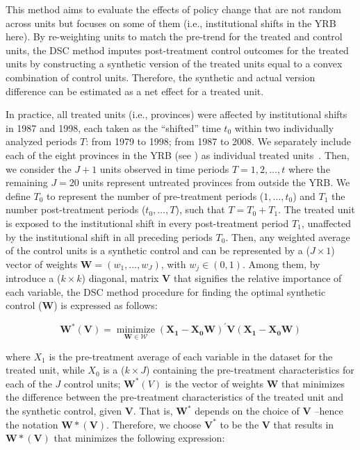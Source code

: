 This method aims to evaluate the effects of policy change that are not random across units but focuses on some of them (i.e., institutional shifts in the YRB here).
By re-weighting units to match the pre-trend for the treated and control units, the DSC method imputes post-treatment control outcomes for the treated units by constructing a synthetic version of the treated units equal to a convex combination of control units.
Therefore, the synthetic and actual version difference can be estimated as a net effect for a treated unit.

In practice, all treated units (i.e., provinces) were affected by institutional shifts in 1987 and 1998, each taken as the ``shifted'' time $t_0$ within two individually analyzed periods $T$: from 1979 to 1998; from 1987 to 2008.
We separately include each of the eight provinces in the YRB (see \textit{}) as individual treated units~\cite{abadie2021}.
Then, we consider the $J+1$ units observed in time periods $T = {1, 2, \ldots, t}$ where the remaining $J=20$ units represent untreated provinces from outside the YRB.
We define $T_0$ to represent the number of pre-treatment periods ($1,\ldots,t_0$) and $T_1$ the number post-treatment periods ($t_0, \ldots, T$), such that $T = T_0+ T_1$.
The treated unit is exposed to the institutional shift in every post-treatment period $T_1$, unaffected by the institutional shift in all preceding periods $T_0$.
Then, any weighted average of the control units is a synthetic control and can be represented by a ($J \times 1$) vector of weights $\mathbf{W} = (w_{1}, \ldots ,w_{J})$, with $w_j \in (0, 1)$.
Among them, by introduce a ($k \times k$) diagonal, matrix $\mathbf{V}$ that signifies the relative importance of each variable, the DSC method procedure for finding the optimal synthetic control ($\mathbf{W}$) is expressed as follows:

\begin{equation}
    \mathbf{W^{*}(V)}=\underset{\mathbf{W} \in \mathcal{W}}{\operatorname{minimize}}\left(\mathbf{X}_{\mathbf{1}}-\mathbf{X}_{\mathbf{0}} \mathbf{W}\right)^{\prime} \mathbf{V}\left(\mathbf{X}_{\mathbf{1}}-\mathbf{X}_{\mathbf{0}} \mathbf{W}\right)
\end{equation}

where $X_1$ is the pre-treatment average of each variable in the dataset for the treated unit, while $X_0$ is a ($k \times J$) containing the pre-treatment characteristics for each of the $J$ control units; $\mathbf{W}^{*}(V)$ is the vector of weights $\mathbf{W}$ that minimizes the difference between the pre-treatment characteristics of the treated unit and the synthetic control, given $\mathbf{V}$. That is, $\mathbf{W^{*}}$ depends on the choice of $\mathbf{V}$ –hence the notation $\mathbf{W*(V)}$. Therefore, we choose $\mathbf{V^{*}}$ to be the $\mathbf{V}$ that results in $\mathbf{W*(V)}$ that minimizes the following expression:

